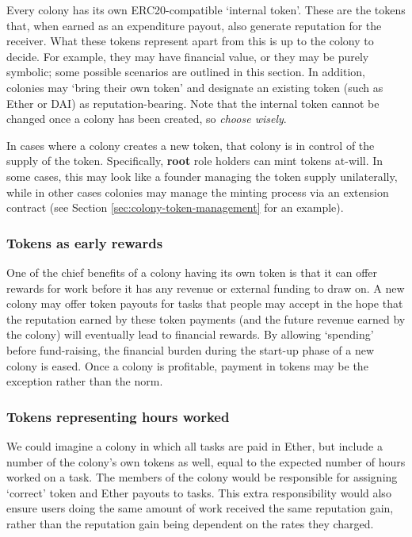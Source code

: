 Every colony has its own ERC20-compatible `internal token'. These are the tokens that, when earned as an expenditure payout, also generate reputation for the receiver. What these tokens represent apart from this is up to the colony to decide. For example, they may have financial value, or they may be purely symbolic; some possible scenarios are outlined in this section. In addition, colonies may `bring their own token' and designate an existing token (such as Ether or DAI) as reputation-bearing. Note that the internal token cannot be changed once a colony has been created, so \textit{choose wisely}.

In cases where a colony creates a new token, that colony is in control of the supply of the token. Specifically, \textbf{root} role holders can mint tokens at-will. In some cases, this may look like a founder managing the token supply unilaterally, while in other cases colonies may manage the minting process via an extension contract (see Section \ref{sec:colony-token-management} for an example).

\subsubsection*{Tokens as early rewards}

One of the chief benefits of a colony having its own token is that it can offer rewards for work before it has any revenue or external funding to draw on.
A new colony may offer token payouts for tasks that people may accept in the hope that the reputation earned by these token payments (and the future revenue earned by the colony) will eventually lead to financial rewards. By allowing `spending' before fund-raising, the financial burden during the start-up phase of a new colony is eased. Once a colony is profitable, payment in tokens may be the exception rather than the norm.

\subsubsection*{Tokens representing hours worked}

We could imagine a colony in which all tasks are paid in Ether, but include a number of the colony's own tokens as well, equal to the expected number of hours worked on a task. The members of the colony would be responsible for assigning `correct' token and Ether payouts to tasks. This extra responsibility would also ensure users doing the same amount of work received the same reputation gain, rather than the reputation gain being dependent on the rates they charged.

